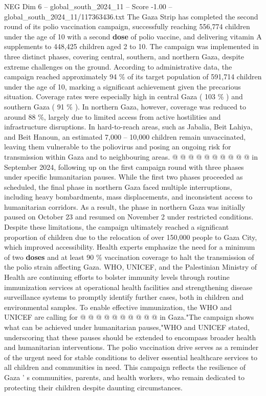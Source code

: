 \begin{textsample}{NEG Dim 6 – global\_south\_2024\_11 – Score -1.00 – global\_south\_2024\_11/117363436.txt}  \label{ex:f6_neg_111}
The Gaza Strip has completed the second round of its polio vaccination campaign, successfully reaching 556,774 children under the age of 10 with a second \textbf{dose} of polio vaccine, and delivering vitamin A supplements to 448,425 children aged 2 to 10.
The campaign was implemented in three distinct phases, covering central, southern, and northern Gaza, despite extreme challenges on the ground.
According to administrative data, the campaign reached approximately 94 \% of its target population of 591,714 children under the age of 10, marking a significant achievement given the precarious situation.
Coverage rates were especially high in central Gaza ( 103 \% ) and southern Gaza ( 91 \% ).
In northern Gaza, however, coverage was reduced to around 88 \%, largely due to limited access from active hostilities and infrastructure disruptions.
In hard-to-reach areas, such as Jabalia, Beit Lahiya, and Beit Hanoun, an estimated 7,000 -- 10,000 children remain unvaccinated, leaving them vulnerable to the poliovirus and posing an ongoing risk for transmission within Gaza and to neighbouring areas. @ @ @ @ @ @ @ @ @ @ in September 2024, following up on the first campaign round with three phases under specific humanitarian pauses.
While the first two phases proceeded as scheduled, the final phase in northern Gaza faced multiple interruptions, including heavy bombardments, mass displacements, and inconsistent access to humanitarian corridors.
As a result, the phase in northern Gaza was initially paused on October 23 and resumed on November 2 under restricted conditions.
Despite these limitations, the campaign ultimately reached a significant proportion of children due to the relocation of over 150,000 people to Gaza City, which improved accessibility.
Health experts emphasize the need for a minimum of two \textbf{doses} and at least 90 \% vaccination coverage to halt the transmission of the polio strain affecting Gaza.
WHO, UNICEF, and the Palestinian Ministry of Health are continuing efforts to bolster immunity levels through routine immunization services at operational health facilities and strengthening disease surveillance systems to promptly identify further cases, both in children and environmental samples.
To enable effective immunization, the WHO and UNICEF are calling for @ @ @ @ @ @ @ @ @ @ in Gaza."The campaign shows what can be achieved under humanitarian pauses,"WHO and UNICEF stated, underscoring that these pauses should be extended to encompass broader health and humanitarian interventions.
The polio vaccination drive serves as a reminder of the urgent need for stable conditions to deliver essential healthcare services to all children and communities in need.
This campaign reflects the resilience of Gaza ' s communities, parents, and health workers, who remain dedicated to protecting their children despite daunting circumstances.

\end{textsample}

